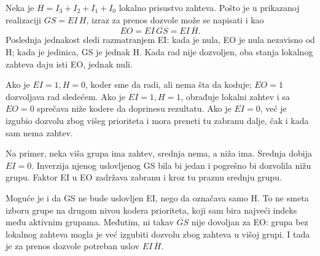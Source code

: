 
Neka je \(H=I_3+I_2+I_1+I_0\) lokalno prisustvo zahteva. Pošto je u prikazanoj realizaciji \(GS=EI\,H\), izraz za prenos dozvole može se napisati i kao
\[
 EO=EI\,\overline{GS}=EI\,\overline H.
\]
Poslednja jednakost sledi razmatranjem EI: kada je nula, EO je nula nezavisno od H; kada je jedinica, GS je jednak H. Kada rad nije dozvoljen, oba stanja lokalnog zahteva daju isti EO, jednak nuli.

Ako je \(EI=1,H=0\), koder sme da radi, ali nema šta da koduje; \(EO=1\) dozvoljava rad sledećem. Ako je \(EI=1,H=1\), obrađuje lokalni zahtev i sa \(EO=0\) sprečava niže kodere da doprinesu rezultatu. Ako je \(EI=0\), već je izgubio dozvolu zbog višeg prioriteta i mora preneti tu zabranu dalje, čak i kada sam nema zahtev.

Na primer, neka viša grupa ima zahtev, srednja nema, a niža ima. Srednja dobija \(EI=0\). Inverzija njenog uslovljenog GS bila bi jedan i pogrešno bi dozvolila nižu grupu. Faktor EI u EO zadržava zabranu i kroz tu praznu srednju grupu.

Moguće je i da GS ne bude uslovljen EI, nego da označava samo H. To ne smeta izboru grupe na drugom nivou kodera prioriteta, koji sam bira najveći indeks među aktivnim grupama. Međutim, ni takav \(\overline{GS}\) nije dovoljan za EO: grupa bez lokalnog zahteva mogla je već izgubiti dozvolu zbog zahteva u višoj grupi. I tada je za prenos dozvole potreban uslov \(EI\,\overline H\).

